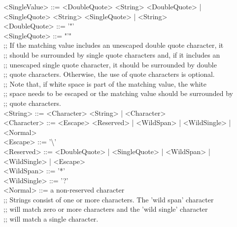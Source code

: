 \settowidth{\uL}{<SingleValue> ::= }%
<SingleValue> ::= <DoubleQuote> <String> <DoubleQuote> |\\
\hspace*{\uL}<SingleQuote> <String> <SingleQuote> | <String>\\
<DoubleQuote> ::= '"'\\
<SingleQuote> ::= "'"\\
;; If the matching value includes an unescaped double quote character, it\\
;; should be surrounded by single quote characters and, if it includes an\\
;; unescaped single quote character, it should be surrounded by double\\
;; quote characters. Otherwise, the use of quote characters is optional.\\
;; Note that, if white space is part of the matching value, the white\\
;; space needs to be escaped or the matching value should be surrounded by\\
;; quote characters.\\
\newpage
<String> ::= <Character> <String> | <Character>\\
\settowidth{\uL}{<Character> ::= }%
<Character> ::= <Escape> <Reserved> | <WildSpan> | <WildSingle> |\\
\hspace*{\uL}<Normal>\\
<Escape> ::= '\textbackslash'\\
\settowidth{\uL}{<Reserved> ::= }%
<Reserved> ::= <DoubleQuote> | <SingleQuote> | <WildSpan> |\\
\hspace*{\uL}<WildSingle> | <Escape>\\
<WildSpan> ::= '*'\\
<WildSingle> ::= '?'\\
<Normal> ::= a non-reserved character\\
;; Strings consist of one or more characters. The 'wild span' character\\
;; will match zero or more characters and the 'wild single' character\\
;; will match a single character.
\outputEnd{}
\appendixEnd{}
